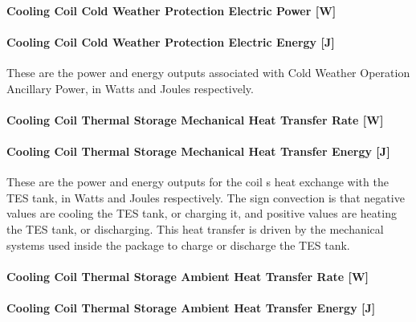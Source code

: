 \paragraph{Cooling Coil Cold Weather Protection Electric Power {[}W{]}}\label{cooling-coil-cold-weather-protection-electric-power-w}

\paragraph{Cooling Coil Cold Weather Protection Electric Energy {[}J{]}}\label{cooling-coil-cold-weather-protection-electric-energy-j}

These are the power and energy outputs associated with Cold Weather Operation Ancillary Power, in Watts and Joules respectively.

\paragraph{Cooling Coil Thermal Storage Mechanical Heat Transfer Rate {[}W{]}}\label{cooling-coil-thermal-storage-mechanical-heat-transfer-rate-w}

\paragraph{Cooling Coil Thermal Storage Mechanical Heat Transfer Energy {[}J{]}}\label{cooling-coil-thermal-storage-mechanical-heat-transfer-energy-j}

These are the power and energy outputs for the coil s heat exchange with the TES tank, in Watts and Joules respectively. The sign convection is that negative values are cooling the TES tank, or charging it, and positive values are heating the TES tank, or discharging. This heat transfer is driven by the mechanical systems used inside the package to charge or discharge the TES tank.

\paragraph{Cooling Coil Thermal Storage Ambient Heat Transfer Rate {[}W{]}}\label{cooling-coil-thermal-storage-ambient-heat-transfer-rate-w}

\paragraph{Cooling Coil Thermal Storage Ambient Heat Transfer Energy {[}J{]}}\label{cooling-coil-thermal-storage-ambient-heat-transfer-energy-j}

